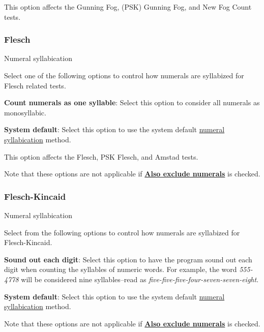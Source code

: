 \documentclass[
]{book}
\newenvironment{optionssection}
    {
    \begin{tcolorbox}[colframe=lightgray,colback=ultralightgray,sharp corners=all,parbox=false]
    }
    {
    \end{tcolorbox}
    }
\newenvironment{optionssectiontitle}
    {
    \begin{tcolorbox}[colframe=lightgray,colback=lightgray]
    \bfseries
    }
    {
    \end{tcolorbox}
    }
\theoremstyle{definition}
\theoremstyle{definition}
\theoremstyle{definition}
\theoremstyle{definition}
\theoremstyle{remark}
\begin{document}
This option affects the Gunning Fog, (PSK) Gunning Fog, and New Fog Count tests.

\hypertarget{options-flesch}{%
\subsubsection*{Flesch}\label{options-flesch}}

\begin{optionssection}

\begin{optionssectiontitle}
Numeral syllabication

\end{optionssectiontitle}

Select one of the following options to control how numerals are syllabized for Flesch related tests.

\textbf{Count numerals as one syllable}: Select this option to consider all numerals as monosyllabic.

\textbf{System default}: Select this option to use the system default \protect\hyperlink{numsyllable}{numeral syllabication} method.

This option affects the Flesch, PSK Flesch, and Amstad tests.

Note that these options are not applicable if \protect\hyperlink{options-text-exclusion}{\textbf{Also exclude numerals}} is checked.

\end{optionssection}

\hypertarget{options-flesch-kincaid}{%
\subsubsection*{Flesch-Kincaid}\label{options-flesch-kincaid}}

\begin{optionssection}

\begin{optionssectiontitle}
Numeral syllabication

\end{optionssectiontitle}

Select from the following options to control how numerals are syllabized for Flesch-Kincaid.

\textbf{Sound out each digit}: Select this option to have the program sound out each digit when counting the syllables of numeric words. For example, the word \emph{555-4778} will be considered nine syllables--read as \emph{five-five-five-four-seven-seven-eight}.

\textbf{System default}: Select this option to use the system default \protect\hyperlink{numsyllable}{numeral syllabication} method.

Note that these options are not applicable if \protect\hyperlink{options-text-exclusion}{\textbf{Also exclude numerals}} is checked.

\end{optionssection}
\end{document}
